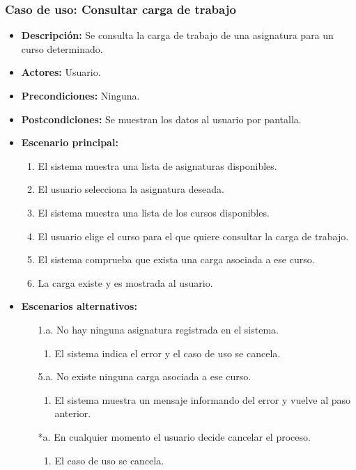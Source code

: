 \documentclass{book}
\begin{document}
\subsubsection*{Caso de uso: Consultar carga de trabajo}
\begin{itemize}
\item{\bf Descripción:} Se consulta la carga de trabajo de una asignatura para un curso determinado.
\item{\bf Actores:} Usuario.
\item{\bf Precondiciones:} Ninguna.
\item{\bf Postcondiciones:} Se muestran los datos al usuario por pantalla.
\item{\bf Escenario principal:}
	\begin{enumerate}
	\item El sistema muestra una lista de asignaturas disponibles.
	\item El usuario selecciona la asignatura deseada.
	\item El sistema muestra una lista de los cursos disponibles.
	\item El usuario elige el curso para el que quiere consultar la carga de trabajo.
	\item El sistema comprueba que exista una carga asociada a ese curso.
	\item La carga existe y es mostrada al usuario.
	\end{enumerate}
\item{\bf Escenarios alternativos:}
	\begin{itemize}
	\item[1.a.]No hay ninguna asignatura registrada en el sistema.
		\begin{enumerate}
		\item El sistema indica el error y el caso de uso se cancela.
		\end{enumerate}
	\item[5.a.]No existe ninguna carga asociada a ese curso.
		\begin{enumerate}
		\item El sistema muestra un mensaje informando del error y vuelve al paso anterior.
		\end{enumerate}
	\item[*a.]En cualquier momento el usuario decide cancelar el proceso.
		\begin{enumerate}
		\item El caso de uso se cancela.
		\end{enumerate}		
	\end{itemize}
\end{itemize}
\end{document}
